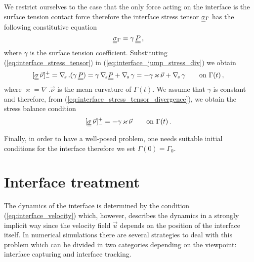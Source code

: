We restrict ourselves to the case that the only force acting on the interface
is the surface tension contact force therefore the interface stress tensor
$\mat\sigma_\Gamma$ has the following constitutive equation
\begin{equation}\label{eq:interface_stress_tensor}
\mat\sigma_{\Gamma}=\gamma\,\mat P\,,
\end{equation}
where $\gamma$ is the surface tension coefficient. Substituting
(\ref{eq:interface_stress_tensor}) in (\ref{eq:interface_jump_stress_div}) we
obtain
\begin{equation}\label{eq:interface_stress_tensor_divergence}
[\mat\sigma\,\vec \nu]_-^+ = \nabs\,.(\gamma\,\mat P)=\gamma\,\nabs\mat
P+\nabs\,\gamma=-\gamma\,\varkappa\,\vec\nu + \nabs\,\gamma \qquad \mbox{on }
\Gamma(t)\,,
\end{equation}
where $\varkappa = \nabla\,.\vec\nu$ is the mean curvature of $\Gamma(t)$. We
assume that $\gamma$ is constant and therefore, from
(\ref{eq:interface_stress_tensor_divergence}), we obtain the stress balance
condition
\begin{equation}\label{eq:interface_jump_stress}
[\mat\sigma\,\vec \nu]_-^+ = -\gamma\,\varkappa\,\vec\nu \qquad \mbox{on }
\Gamma(t)\,.
\end{equation}

Finally, in order to have a well-posed problem, one needs suitable initial
conditions for the interface therefore we set $\Gamma(0)=\Gamma_0$.

\section[Interface treatment]{Interface treatment}
The dynamics of the interface is determined by the condition
(\ref{eq:interface_velocity}) which, however, describes the dynamics in a
strongly implicit way since the velocity field $\vec u$ depends on the
position of the interface itself. In numerical simulations there are
several strategies to deal with this problem which can be divided in two
categories depending on the viewpoint: interface capturing and interface
tracking.

